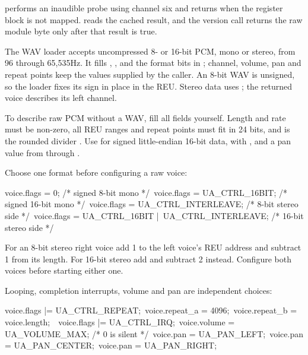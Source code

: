  performs an inaudible probe using channel six
and returns  when the register block is not
mapped.  reads the cached result, and the
version call returns the raw module byte only after that result is true.

The WAV loader accepts uncompressed 8- or 16-bit PCM, mono or stereo, from 96
through 65,535Hz. It fills , ,  and the
format bits in ; channel, volume, pan and repeat points keep the
values supplied by the caller. An 8-bit WAV is unsigned, so the loader fixes
its sign in place in the REU. Stereo data uses
; the returned voice describes its left channel.

To describe raw PCM without a WAV, fill all fields yourself. Length and rate
must be non-zero, all REU ranges and repeat points must fit in 24 bits, and
 is the rounded divider
. Use  for signed
little-endian 16-bit data,  with
, and a pan value from
 through .

Choose one format before configuring a raw voice:

\begin{listingbox}
voice.flags = 0;                         /* signed 8-bit mono */\
voice.flags = UA\_CTRL\_16BIT;           /* signed 16-bit mono */\
voice.flags = UA\_CTRL\_INTERLEAVE;      /* 8-bit stereo side */\
voice.flags = UA\_CTRL\_16BIT |\
              UA\_CTRL\_INTERLEAVE;      /* 16-bit stereo side */
\end{listingbox}

\begin{resultbox}
For an 8-bit stereo right voice add 1 to the left voice's REU address and
subtract 1 from its length. For 16-bit stereo add and subtract 2 instead.
Configure both voices before starting either one.
\end{resultbox}

Looping, completion interrupts, volume and pan are independent choices:

\begin{listingbox}
voice.flags |= UA\_CTRL\_REPEAT;\
voice.repeat\_a = 4096;\
voice.repeat\_b = voice.length;\
\
voice.flags |= UA\_CTRL\_IRQ;\
voice.volume = UA\_VOLUME\_MAX;          /* 0 is silent */\
voice.pan = UA\_PAN\_LEFT;\
voice.pan = UA\_PAN\_CENTER;\
voice.pan = UA\_PAN\_RIGHT;
\end{listingbox}

